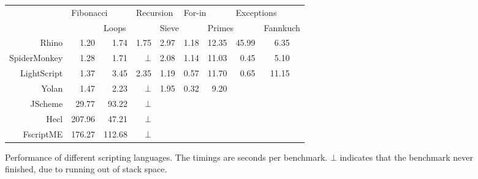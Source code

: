 \begin{figure}
\begin{center}
\begin{tabular}{|r|r|r|r|r|r|r|r|rr|}
\hline 
& \multicolumn{2}{|l|}{Fibonacci} & \multicolumn{2}{|l|}{Recursion} & \multicolumn{2}{|l|}{For-in} & \multicolumn{2}{|l}{Exceptions} & \\
& & \multicolumn{2}{|l|}{Loops} & \multicolumn{2}{|l|}{Sieve} & \multicolumn{2}{|l|}{Primes} & \multicolumn{2}{|l|}{Fannkuch} \\
\hline 
Rhino       & 1.20 & 1.74 & 1.75   & 2.97 & 1.18 & 12.35 & 45.99 & 6.35 & \\ 
\hline 
SpiderMonkey& 1.28 & 1.71 & $\bot$ & 2.08 & 1.14 & 11.03 & 0.45  & 5.10 & \\ 
\hline 
LightScript & 1.37 & 3.45 & 2.35   & 1.19 & 0.57 & 11.70 & 0.65  & 11.15 & \\
\hline 
Yolan       & 1.47 & 2.23 & $\bot$ & 1.95 & 0.32 &  9.20 &  &  & \\
\hline 
JScheme    & 29.77 & 93.22 & $\bot$ & & & & & & \\ 
\hline 
Hecl      & 207.96 & 47.21 & $\bot$ & & & & & & \\ 
\hline 
FscriptME & 176.27 & 112.68& $\bot$ & & & & & & \\ 
\hline 
\end{tabular}
\caption{Performance of different scripting languages. The timings are seconds per benchmark. $\bot$ indicates that the benchmark never finished, due to running out of stack space.}
\end{center}
\end{figure}
